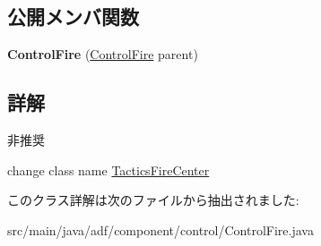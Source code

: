 \subsection*{公開メンバ関数}
\begin{DoxyCompactItemize}
\item 
\hypertarget{classadf_1_1component_1_1control_1_1ControlFire_a868120301fcf4b970ef05401798baca6}{}\label{classadf_1_1component_1_1control_1_1ControlFire_a868120301fcf4b970ef05401798baca6} 
{\bfseries Control\+Fire} (\hyperlink{classadf_1_1component_1_1control_1_1ControlFire}{Control\+Fire} parent)
\end{DoxyCompactItemize}


\subsection{詳解}
\begin{DoxyRefDesc}{非推奨}
\item[\hyperlink{deprecated__deprecated000011}{非推奨}]change class name \hyperlink{}{Tactics\+Fire\+Center} \end{DoxyRefDesc}


このクラス詳解は次のファイルから抽出されました\+:\begin{DoxyCompactItemize}
\item 
src/main/java/adf/component/control/Control\+Fire.\+java\end{DoxyCompactItemize}
